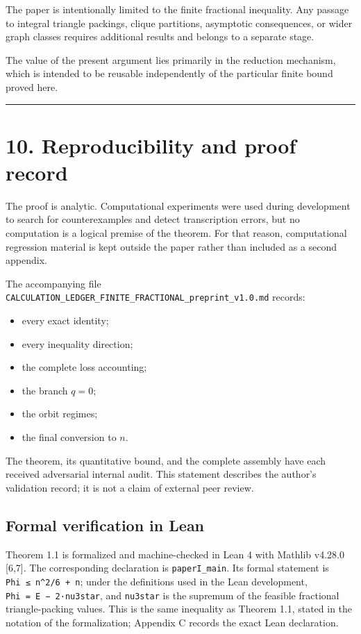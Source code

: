 \documentclass[
  11pt,
]{article}
\providecommand{\tightlist}{%
  \setlength{\itemsep}{0pt}\setlength{\parskip}{0pt}}
\begin{document}
The paper is intentionally limited to the finite fractional inequality.
Any passage to integral triangle packings, clique partitions, asymptotic
consequences, or wider graph classes requires additional results and
belongs to a separate stage.

The value of the present argument lies primarily in the reduction
mechanism, which is intended to be reusable independently of the
particular finite bound proved here.

\begin{center}\rule{0.5\linewidth}{0.5pt}\end{center}

\section{10. Reproducibility and proof
record}\label{reproducibility-and-proof-record}

The proof is analytic. Computational experiments were used during
development to search for counterexamples and detect transcription
errors, but no computation is a logical premise of the theorem. For that
reason, computational regression material is kept outside the paper
rather than included as a second appendix.

The accompanying file
\texttt{CALCULATION\_LEDGER\_FINITE\_FRACTIONAL\_preprint\_v1.0.md}
records:

\begin{itemize}
\tightlist
\item
  every exact identity;
\item
  every inequality direction;
\item
  the complete loss accounting;
\item
  the branch \(q=0\);
\item
  the orbit regimes;
\item
  the final conversion to \(n\).
\end{itemize}

The theorem, its quantitative bound, and the complete assembly have each
received adversarial internal audit. This statement describes the
author's validation record; it is not a claim of external peer review.

\subsection{Formal verification in
Lean}\label{formal-verification-in-lean}

Theorem 1.1 is formalized and machine-checked in Lean 4 with Mathlib
v4.28.0 {[}6,7{]}. The corresponding declaration is
\texttt{paperI\_main}. Its formal statement is
\texttt{Phi\ ≤\ n\^{}2/6\ +\ n}; under the definitions used in the Lean
development, \texttt{Phi\ =\ \textbar{}E\textbar{}\ −\ 2·nu3star}, and
\texttt{nu3star} is the supremum of the feasible fractional
triangle-packing values. This is the same inequality as Theorem 1.1,
stated in the notation of the formalization; Appendix C records the
exact Lean declaration.
\end{document}
